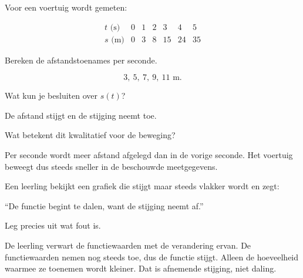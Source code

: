 \documentclass{ximera}
\begin{document}
\begin{oefening}{\oefU\ESS}

Voor een voertuig wordt gemeten:

\[
\begin{array}{c|rrrrrr}
t\text{ (s)}&0&1&2&3&4&5\\ \hline
s\text{ (m)}&0&3&8&15&24&35
\end{array}
\]

\begin{question}
Bereken de afstandstoenames per seconde.
\begin{oplossing}
\[
3,\ 5,\ 7,\ 9,\ 11\text{ m}.
\]
\end{oplossing}
\end{question}

\begin{question}
Wat kun je besluiten over \(s(t)\)?
\begin{oplossing}
De afstand stijgt en de stijging neemt toe.
\end{oplossing}
\end{question}

\begin{question}
Wat betekent dit kwalitatief voor de beweging?
\begin{oplossing}
Per seconde wordt meer afstand afgelegd dan in de vorige seconde.
Het voertuig beweegt dus steeds sneller in de beschouwde meetgegevens.
\end{oplossing}
\end{question}

\end{oefening}


\begin{oefening}{\oefU\ESS}

Een leerling bekijkt een grafiek die stijgt maar steeds vlakker wordt en zegt:

``De functie begint te dalen, want de stijging neemt af.''

Leg precies uit wat fout is.

\begin{oplossing}
De leerling verwart de functiewaarden met de verandering ervan.
De functiewaarden nemen nog steeds toe, dus de functie stijgt.
Alleen de hoeveelheid waarmee ze toenemen wordt kleiner.
Dat is afnemende stijging, niet daling.
\end{oplossing}

\end{oefening}
\end{document}
